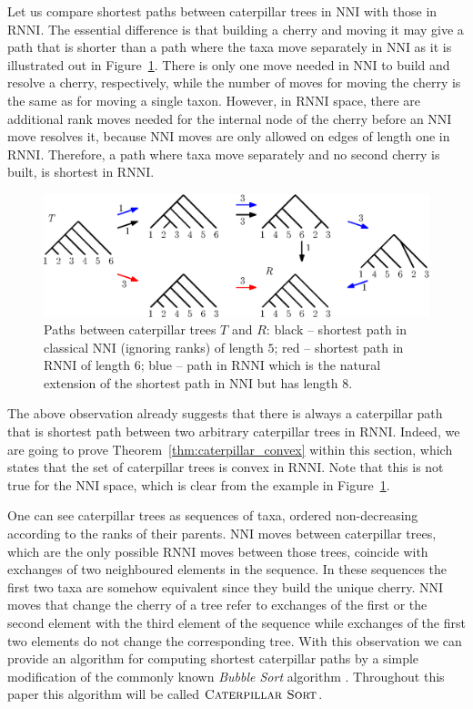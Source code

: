 \documentclass{amsart}
\newcommand{\nni}{\mathrm{NNI}}
\newcommand{\rnni}{\mathrm{RNNI}}
\newcommand{\csort}{\textsc{Caterpillar Sort}}
\begin{document}
Let us compare shortest paths between caterpillar trees in $\nni$ with those in $\rnni$.
The essential difference is that building a cherry and moving it may give a path that is shorter than a path where the taxa move separately in $\nni$ as it is illustrated out in Figure~\ref{fig:NNI_vs_RNNI}.
There is only one move needed in $\nni$ to build and resolve a cherry, respectively, while the number of moves for moving the cherry is the same as for moving a single taxon.
However, in $\rnni$ space, there are additional rank moves needed for the internal node of the cherry before an $\nni$ move resolves it, because $\nni$ moves are only allowed on edges of length one in $\rnni$.
Therefore, a path where taxa move separately and no second cherry is built, is shortest in $\rnni$.

\begin{figure}[H]
	\centering
	\includegraphics[width=\textwidth]{NNI_vs_RNNI}
	\caption{Paths between caterpillar trees $T$ and $R$: black -- shortest path in classical $\nni$ (ignoring ranks) of length $5$; red -- shortest path in $\rnni$ of length $6$; blue -- path in $\rnni$ which is the natural extension of the shortest path in $\nni$ but has length $8$.}
	\label{fig:NNI_vs_RNNI}
\end{figure}

The above observation already suggests that there is always a caterpillar path that is shortest path between two arbitrary caterpillar trees in $\rnni$.
Indeed, we are going to prove Theorem~\ref{thm:caterpillar_convex} within this section, which states that the set of caterpillar trees is convex in $\rnni$.
Note that this is not true for the $\nni$ space, which is clear from the example in Figure~\ref{fig:NNI_vs_RNNI}.

One can see caterpillar trees as sequences of taxa, ordered non-decreasing according to the ranks of their parents.
$\nni$ moves between caterpillar trees, which are the only possible $\rnni$ moves between those trees, coincide with exchanges of two neighboured elements in the sequence.
In these sequences the first two taxa are somehow equivalent since they build the unique cherry.
$\nni$ moves that change the cherry of a tree refer to exchanges of the first or the second element with the third element of the sequence while exchanges of the first two elements do not change the corresponding tree.
With this observation we can provide an algorithm for computing shortest caterpillar paths by a simple modification of the commonly known \emph{Bubble Sort} algorithm \autocite{knuth1997}.
Throughout this paper this algorithm will be called $\csort$.
\end{document}
